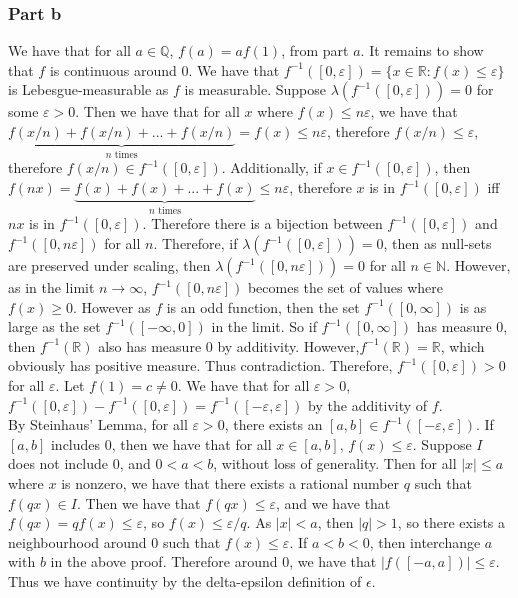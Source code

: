 \documentclass{article}
\theoremstyle{definition}
\numberwithin{theorem}{section}
\numberwithin{equation}{section}
\begin{document}
\subsubsection{Part b}
We have that for all $a \in \mathbb{Q}$, $f(a) = a f(1)$, from part $a$. It remains to show that $f$ is continuous around $0$. We have that $f^{-1}([0, \varepsilon]) = \lbrace x \in \mathbb{R}: f(x) \leq \varepsilon \rbrace$ is Lebesgue-measurable as $f$ is measurable. Suppose $\lambda(f^{-1}([0, \varepsilon])) = 0$ for some $\varepsilon > 0$. Then we have that for all $x$ where $f(x) \leq n\varepsilon$, we have that $\underbrace{f(x/n) + f(x/n) + ... + f(x/n)}_{n \text{ times}} = f(x) \leq n \varepsilon$, therefore $f(x/n) \leq \varepsilon$, therefore $f(x/n) \in f^{-1}([0, \varepsilon]) $. Additionally, if $x \in f^{-1}([0, \varepsilon])$, then $f(n x) = \underbrace{f(x) + f(x) + ... + f(x)}_{n \text{ times}}\leq n \varepsilon$, therefore $x$ is in $f^{-1}([0, \varepsilon])$ iff $nx$ is in $f^{-1}([0, \varepsilon])$. Therefore there is a bijection between $f^{-1}([0, \varepsilon])$ and $f^{-1}([0, n\varepsilon])$ for all $n$. Therefore, if $\lambda(f^{-1}([0, \varepsilon])) = 0$, then as null-sets are preserved under scaling, then $\lambda(f^{-1}([0, n\varepsilon])) = 0$ for all $n \in \mathbb{N}$. However, as in the limit $n \rightarrow \infty$, $f^{-1}([0, n\varepsilon])$ becomes the set of values where $f(x) \geq 0$. However as $f$ is an odd function, then the set $f^{-1}([0, \infty])$ is as large as the set $f^{-1}([-\infty, 0])$ in the limit. So if $f^{-1}([0, \infty])$ has measure 0, then $f^{-1}(\mathbb{R})$ also has measure 0 by additivity. However,$f^{-1}(\mathbb{R}) = \mathbb{R}$, which obviously has positive measure. Thus contradiction. Therefore, $f^{-1}([0, \varepsilon]) > 0$ for all $\varepsilon$. Let $f(1) = c \neq 0$.
We have that for all $\varepsilon > 0$, $f^{-1}([0, \varepsilon]) - f^{-1}([0, \varepsilon]) = f^{-1}([-\varepsilon, \varepsilon])$ by the additivity of $f$.
\\
By Steinhaus' Lemma, for all $\varepsilon > 0$, there exists an $[a,b] \in f^{-1}([-\varepsilon, \varepsilon])$. If $[a,b]$ includes $0$, then we have that for all $x \in [a,b]$, $f(x) \leq \varepsilon$. Suppose $I$ does not include $0$, and $0 < a < b$, without loss of generality. Then for all $|x| \leq a$ where $x$ is nonzero, we have that there exists a rational number $q$ such that $f(qx) \in I$. Then we have that $f(qx) \leq \varepsilon$, and we have that $f(qx) = q f(x) \leq \varepsilon$, so $f(x) \leq \varepsilon/q$. As $|x| < a$, then $|q| > 1$, so there exists a neighbourhood around 0 such that $f(x) \leq \varepsilon$. If $a < b < 0$, then interchange $a$ with $b$ in the above proof. Therefore around 0, we have that $|f([-a, a])| \leq \varepsilon$. Thus we have continuity by the delta-epsilon definition of $\epsilon$. 
\end{document}
